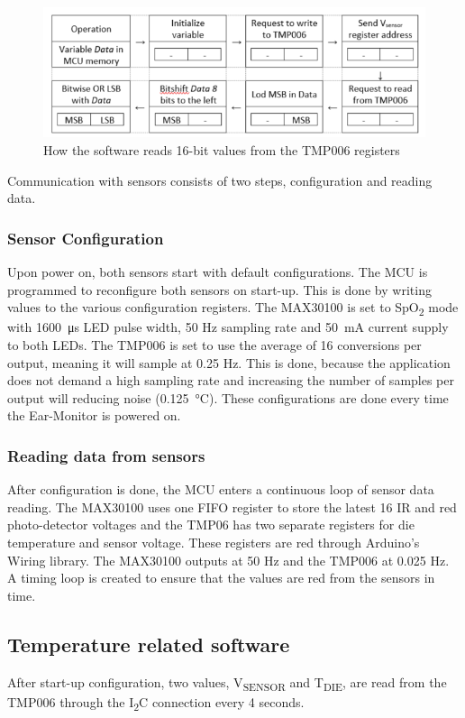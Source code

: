 \begin{figure}[H]
   \centering
   \includegraphics[scale=1]{figs/I2C_Read.png}
   \caption{How the software reads 16-bit values from the TMP006 registers}
   \label{fig:I2C_Read}
\end{figure}

Communication with sensors consists of two steps, configuration and reading data.

\subsubsection{Sensor Configuration}
Upon power on, both sensors start with default configurations. The MCU is programmed to reconfigure both sensors on start-up. This is done by writing values to the various configuration registers.
The MAX30100 is set to SpO\textsubscript{2} mode with \SI{1600}{\micro\second} LED pulse width, 50 Hz sampling rate and \SI{50}{\milli\ampere} current supply to both LEDs. The TMP006 is set to use the average of 16 conversions per output, meaning it will sample at 0.25 Hz. This is done, because the application does not demand a high sampling rate and increasing the number of samples per output will reducing noise (\SI{0.125}{\celsius}). These configurations are done every time the Ear-Monitor is powered on.

\subsubsection{Reading data from sensors}
After configuration is done, the MCU enters a continuous loop of sensor data reading. The MAX30100 uses one FIFO register to store the latest 16 IR and red photo-detector voltages and the TMP06 has two separate registers for die temperature and sensor voltage. These registers are red through Arduino's Wiring library. The MAX30100 outputs at 50 Hz and the TMP006 at 0.025 Hz. A timing loop is created to ensure that the values are red from the sensors in time.

\subsection{Temperature related software}
After start-up configuration, two values, V\textsubscript{SENSOR} and T\textsubscript{DIE}, are read from the TMP006 through the I\textsubscript{2}C connection every 4 seconds.

